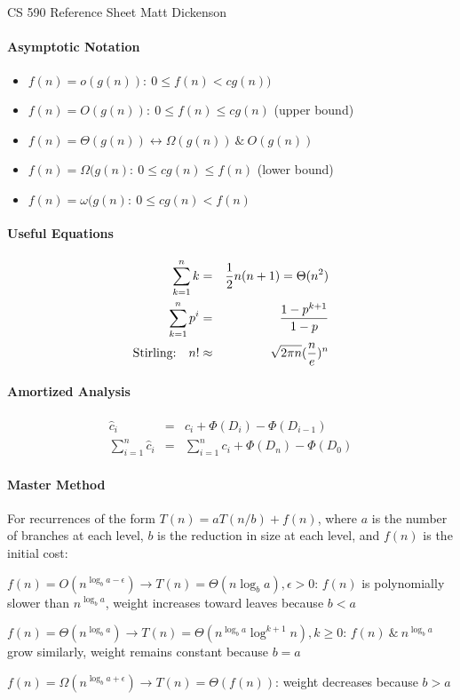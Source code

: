 \documentclass[10pt,letterpaper]{article}
\begin{document}
\large CS 590 Reference Sheet \hfill Matt Dickenson
\headsep 10pt

\paragraph{Asymptotic Notation}
\begin{itemize}
\item $f(n)=o(g(n)):~ 0 \leq f(n) < cg(n))$
\item $f(n)=O(g(n)):~0 \leq f(n) \leq cg(n)$ (upper bound) 
\item $f(n)=\Theta(g(n)) \leftrightarrow \Omega(g(n))~\&~O(g(n)) $
\item $f(n)=\Omega(g(n):~0 \leq cg(n) \leq f(n)$ (lower bound) 
\item $f(n)=\omega(g(n):~0 \leq cg(n) < f(n)$ 
\end{itemize}

\paragraph{Useful Equations}
\begin{eqnarray*}
\sum_{k=1}^n k &=& \frac{1}{2}n(n+1) = \Theta(n^2) \\
\sum_{k=1}^n p^i &=& {1-p^{k+1} \over 1 - p} \\ 
\text{Stirling:}~~~n! &\approx& \sqrt{2\pi n} ({ n \over e})^n
\end{eqnarray*}

\paragraph{Amortized Analysis}
\begin{eqnarray*}
\hat{c}_i &=& c_i + \Phi(D_i) - \Phi(D_{i-1}) \\
\sum_{i=1}^n \hat{c}_i &=& \sum_{i=1}^n c_i + \Phi(D_n)-\Phi(D_0)
\end{eqnarray*}

\paragraph{Master Method}
For recurrences of the form $T(n)=a T(n/b) + f(n)$, where $a$ is the number of branches at each level, $b$ is the reduction in size at each level, and $f(n)$ is the initial cost:

\begin{list}{\textbf{Case} :~}{}
\item $f(n) = O(n^{\log_b a - \epsilon}) \rightarrow T(n)=\Theta(n \log_b a), \epsilon>0$: $f(n)$ is polynomially slower than $n^{\log_b a}$, weight increases toward leaves because $b<a$
\item $f(n)=\Theta(n^{\log_b a}) \rightarrow T(n)=\Theta(n^{\log_b a} \log^{k+1} n), k\geq 0$: $f(n)~\&~n^{\log_b a}$ grow similarly, weight remains constant because $b=a$
\item $f(n)=\Omega(n^{\log_b a + \epsilon}) \rightarrow T(n)=\Theta(f(n))$: weight decreases because $b>a$
\end{list}
\end{document}
